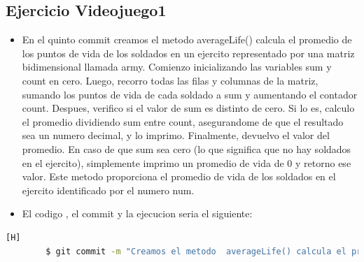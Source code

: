 \documentclass{article}
\begin{document}
	\subsection{Ejercicio Videojuego1}
	\begin{itemize}	
		\item En el quinto commit creamos el metodo  averageLife() calcula el promedio de los puntos de vida de los soldados en un ejercito representado por una matriz bidimensional llamada army. Comienzo inicializando las variables sum y count en cero. Luego, recorro todas las filas y columnas de la matriz, sumando los puntos de vida de cada soldado a sum y aumentando el contador count. Despues, verifico si el valor de sum es distinto de cero. Si lo es, calculo el promedio dividiendo sum entre count, asegurandome de que el resultado sea un numero decimal, y lo imprimo. Finalmente, devuelvo el valor del promedio. En caso de que sum sea cero (lo que significa que no hay soldados en el ejercito), simplemente imprimo un promedio de vida de 0 y retorno ese valor. Este metodo proporciona el promedio de vida de los soldados en el ejercito identificado por el numero num.
		\item El codigo , el commit y la ejecucion seria el siguiente:
	\end{itemize}	
	\begin{lstlisting}[language=bash,caption={Commit}][H]
		$ git commit -m "Creamos el metodo  averageLife() calcula el promedio de los puntos de vida de los soldados en un ejercito representado por una matriz bidimensional llamada army. Comienzo inicializando las variables sum y count en cero. Luego, recorro todas las filas y columnas de la matriz, sumando los puntos de vida de cada soldado a sum y aumentando el contador count. Despues, verifico si el valor de sum es distinto de cero. Si lo es, calculo el promedio dividiendo sum entre count, asegurandome de que el resultado sea un numero decimal, y lo imprimo. Finalmente, devuelvo el valor del promedio. En caso de que sum sea cero (lo que significa que no hay soldados en el ejercito), simplemente imprimo un promedio de vida de 0 y retorno ese valor. Este metodo proporciona el promedio de vida de los soldados en el ejercito identificado por el numero num"
	\end{lstlisting}	
\end{document}
